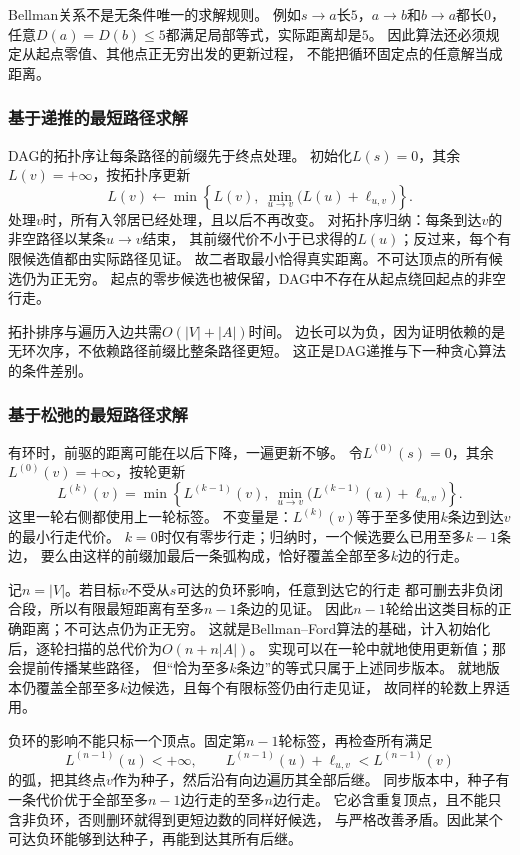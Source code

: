 Bellman关系不是无条件唯一的求解规则。
例如\(s\to a\)长\(5\)，\(a\to b\)和\(b\to a\)都长\(0\)，
任意\(D(a)=D(b)\leq5\)都满足局部等式，实际距离却是\(5\)。
因此算法还必须规定从起点零值、其他点正无穷出发的更新过程，
不能把循环固定点的任意解当成距离。

\subsubsection{基于递推的最短路径求解}

DAG的拓扑序让每条路径的前缀先于终点处理。
初始化\(L(s)=0\)，其余\(L(v)=+\infty\)，按拓扑序更新
\[
  L(v)\leftarrow
  \min\left\{L(v),\ \min_{u\to v}\bigl(L(u)+\ell_{u,v}\bigr)\right\}.
\]
处理\(v\)时，所有入邻居已经处理，且以后不再改变。
对拓扑序归纳：每条到达\(v\)的非空路径以某条\(u\to v\)结束，
其前缀代价不小于已求得的\(L(u)\)；反过来，每个有限候选值都由实际路径见证。
故二者取最小恰得真实距离。不可达顶点的所有候选仍为正无穷。
起点的零步候选也被保留，DAG中不存在从起点绕回起点的非空行走。

拓扑排序与遍历入边共需\(O(|V|+|A|)\)时间。
边长可以为负，因为证明依赖的是无环次序，不依赖路径前缀比整条路径更短。
这正是DAG递推与下一种贪心算法的条件差别。

\subsubsection{基于松弛的最短路径求解}

有环时，前驱的距离可能在以后下降，一遍更新不够。
令\(L^{(0)}(s)=0\)，其余\(L^{(0)}(v)=+\infty\)，按轮更新
\[
  L^{(k)}(v)=
  \min\left\{
    L^{(k-1)}(v),\
    \min_{u\to v}\bigl(L^{(k-1)}(u)+\ell_{u,v}\bigr)
  \right\}.
\]
这里一轮右侧都使用上一轮标签。
不变量是：\(L^{(k)}(v)\)等于至多使用\(k\)条边到达\(v\)的最小行走代价。
\(k=0\)时仅有零步行走；归纳时，一个候选要么已用至多\(k-1\)条边，
要么由这样的前缀加最后一条弧构成，恰好覆盖全部至多\(k\)边的行走。

记\(n=|V|\)。若目标\(v\)不受从\(s\)可达的负环影响，任意到达它的行走
都可删去非负闭合段，所以有限最短距离有至多\(n-1\)条边的见证。
因此\(n-1\)轮给出这类目标的正确距离；不可达点仍为正无穷。
这就是Bellman--Ford算法的基础，计入初始化后，逐轮扫描的总代价为\(O(n+n|A|)\)。
实现可以在一轮中就地使用更新值；那会提前传播某些路径，
但“恰为至多\(k\)条边”的等式只属于上述同步版本。
就地版本仍覆盖全部至多\(k\)边候选，且每个有限标签仍由行走见证，
故同样的轮数上界适用。

负环的影响不能只标一个顶点。固定第\(n-1\)轮标签，再检查所有满足
\[
  L^{(n-1)}(u)<+\infty,\qquad
  L^{(n-1)}(u)+\ell_{u,v}<L^{(n-1)}(v)
\]
的弧，把其终点\(v\)作为种子，然后沿有向边遍历其全部后继。
同步版本中，种子有一条代价优于全部至多\(n-1\)边行走的至多\(n\)边行走。
它必含重复顶点，且不能只含非负环，否则删环就得到更短边数的同样好候选，
与严格改善矛盾。因此某个可达负环能够到达种子，再能到达其所有后继。

